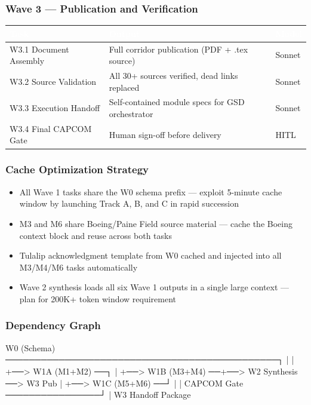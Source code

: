 \documentclass[11pt,letterpaper]{article}
\newcommand{\tableheader}[1]{\textbf{\sffamily\textcolor{white}{#1}}}
\begin{document}
\subsubsection{Wave 3 --- Publication and Verification}

\begin{center}
\begin{tabularx}{\textwidth}{L{3cm}XC{2cm}}
\toprule
{}
\tableheader{Task} & \tableheader{Output} & \tableheader{Model} \\
\midrule
W3.1 Document Assembly & Full corridor publication (PDF + .tex source) & Sonnet \\
W3.2 Source Validation & All 30+ sources verified, dead links replaced & Sonnet \\
W3.3 Execution Handoff & Self-contained module specs for GSD orchestrator & Sonnet \\
W3.4 Final CAPCOM Gate & Human sign-off before delivery & HITL \\
\bottomrule
\end{tabularx}
\end{center}

\subsubsection{Cache Optimization Strategy}
\begin{itemize}[leftmargin=*]
  \item All Wave 1 tasks share the W0 schema prefix --- exploit 5-minute cache window by launching Track A, B, and C in rapid succession
  \item M3 and M6 share Boeing/Paine Field source material --- cache the Boeing context block and reuse across both tasks
  \item Tulalip acknowledgment template from W0 cached and injected into all M3/M4/M6 tasks automatically
  \item Wave 2 synthesis loads all six Wave 1 outputs in a single large context --- plan for 200K+ token window requirement
\end{itemize}

\subsubsection{Dependency Graph}

\begin{asciibox}
W0 (Schema) ──────────────────────────────────────────────┐
       |                                                   |
       +──> W1A (M1+M2) ──┐                               |
       +──> W1B (M3+M4) ──+──> W2 Synthesis ──> W3 Pub   |
       +──> W1C (M5+M6) ──┘         |                     |
                               CAPCOM Gate ────────────────┘
                                    |
                              W3 Handoff Package
\end{asciibox}
\end{document}

